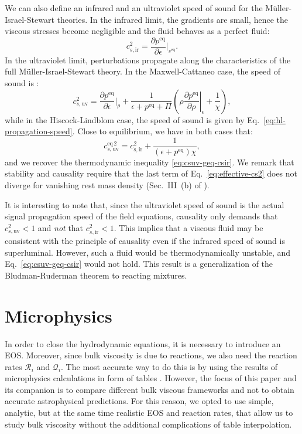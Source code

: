 \documentclass[aps,prd,twocolumn,a4paper,floatfix,nofootbib,superscriptaddress,nofootinbib]{revtex4}
\newcommand{\req}{\mathrm{eq}}
\begin{document}
We can also define an infrared and an ultraviolet speed of sound
for the M\"uller-Israel-Stewart theories.
In the infrared limit, the gradients are small, hence the viscous stresses become
negligible and the fluid behaves as a perfect fluid:
%
\begin{equation}
\label{eq:csir-bulk}
c_{s,\mathrm{ir}}^2  = \dfrac{\partial p^\req}{\partial \epsilon}\bigg|_{s^\req}.
\end{equation}
%
In the ultraviolet limit, perturbations propagate along the characteristics
of the full M\"uller-Israel-Stewart theory.
In the Maxwell-Cattaneo case, the speed of sound is \cite{Bemfica19}:
%
\begin{equation}
\label{eq:cs-bemfica}
c_{s,\mathrm{uv}}^2  = \frac{\partial p^\req}{\partial \epsilon}\bigg|_\rho
+\frac{1}{\epsilon+p^\req+\Pi}\left(\rho\left.\frac{\partial p^\req}{\partial \rho}\right|_\epsilon
+ \frac{1}{\chi}\right),
\end{equation}
%
while in the Hiscock-Lindblom case, the speed of sound is given by Eq.~\eqref{eq:hl-propagation-speed}.
%
Close to equilibrium, we have in both cases that:
%
\begin{equation}
\label{eq:effective-cs2}
c_{s,\mathrm{uv}}^{\req \, 2}= c_\mathrm{s,ir}^2 + \frac{1}{(\epsilon+p^\req)\chi},
\end{equation}
%
and we recover the thermodynamic inequality \eqref{eq:csuv-geq-csir}.
We remark that stability and causality require that the last term of Eq.~\eqref{eq:effective-cs2}
does not diverge for vanishing rest mass density (Sec.~III~(b) of \citet{Hiscock1983}).

It is interesting to note that, since the ultraviolet speed of sound is the
actual signal propagation speed of the field equations, causality only demands that
$c_{s,\mathrm{uv}}^{2}<1$ and \textit{not} that $c_{s,\mathrm{ir}}^{2}<1$.
This implies that a viscous fluid may be consistent with the principle of
causality even if the infrared speed of sound is superluminal. However, such a
fluid would be thermodynamically unstable, and Eq.~\eqref{eq:csuv-geq-csir}
would not hold. This result is a generalization of the Bludman-Ruderman theorem
\cite{BludmanIstab1970} to reacting mixtures.

\section{Microphysics}
\label{sec:microphysics}

In order to close the hydrodynamic equations, it is necessary to introduce an
EOS.  Moreover, since bulk viscosity is due to reactions, we also need the
reaction rates $\mathcal R_i$ and $\mathcal Q_i$.  The most accurate way to do
this is by using the results of microphysics calculations in form of tables
\citep{Typel15, Oertel17}.  However, the focus of this paper and its companion
\citep{Camelio22b} is to compare different bulk viscous frameworks and not to
obtain accurate astrophysical predictions.  For this reason, we opted to use
simple, analytic, but at the same time realistic EOS and reaction rates, that
allow us to study bulk viscosity without the additional complications of table
interpolation.
\end{document}
